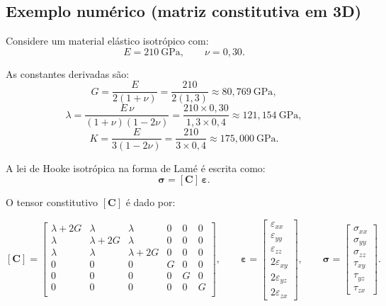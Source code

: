 \subsection{Exemplo numérico (matriz constitutiva em 3D)}

Considere um material elástico isotrópico com:
\[
E = 210~\text{GPa}, \qquad \nu = 0{,}30.
\]

As constantes derivadas são:
\[
G = \frac{E}{2(1+\nu)} = \frac{210}{2(1{,}3)} \approx 80{,}769~\text{GPa},
\]
\[
\lambda = \frac{E\,\nu}{(1+\nu)(1-2\nu)} 
= \frac{210\times 0{,}30}{1{,}3\times 0{,}4}
\approx 121{,}154~\text{GPa},
\]
\[
K = \frac{E}{3(1-2\nu)} = \frac{210}{3\times 0{,}4} \approx 175{,}000~\text{GPa}.
\]

A lei de Hooke isotrópica na forma de Lamé é escrita como:
\[
\boldsymbol{\sigma} = [\mathbf{C}]\,\boldsymbol{\varepsilon}.
\]

O tensor constitutivo $[\mathbf{C}]$ é dado por:

\begingroup
\setlength{\arraycolsep}{6pt}
\renewcommand{\arraystretch}{1.15}

\[
[\mathbf{C}] =
\begin{bmatrix}
\lambda + 2G & \lambda     & \lambda     & 0 & 0 & 0 \\
\lambda       & \lambda + 2G & \lambda     & 0 & 0 & 0 \\
\lambda       & \lambda     & \lambda + 2G & 0 & 0 & 0 \\
0             & 0           & 0           & G & 0 & 0 \\
0             & 0           & 0           & 0 & G & 0 \\
0             & 0           & 0           & 0 & 0 & G \\
\end{bmatrix},
\qquad
\boldsymbol{\varepsilon} =
\begin{bmatrix}
\varepsilon_{xx} \\
\varepsilon_{yy} \\
\varepsilon_{zz} \\
2\varepsilon_{xy} \\
2\varepsilon_{yz} \\
2\varepsilon_{zx}
\end{bmatrix},
\qquad
\boldsymbol{\sigma} =
\begin{bmatrix}
\sigma_{xx} \\
\sigma_{yy} \\
\sigma_{zz} \\
\tau_{xy} \\
\tau_{yz} \\
\tau_{zx}
\end{bmatrix}.
\]
\endgroup

